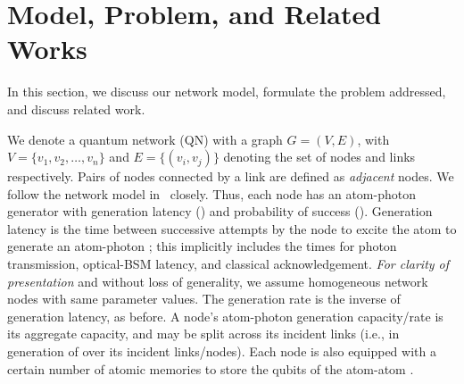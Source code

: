 \section{Model, Problem, and Related Works}
\label{sec:swapping_problem}

In this section, we discuss our network model, formulate the problem addressed, and discuss 
related work. 

We denote a quantum network (QN) with a graph $G = (V, E)$,
with $V = \{v_1, v_2, \ldots, v_n\}$  and $E = \{(v_i, v_j)\}$
denoting the set of nodes and links respectively.
Pairs of nodes connected by a link are defined as \textit{adjacent} nodes. 
We follow the network model in~\cite{caleffi} closely.
Thus, each node has an atom-photon \eps generator with generation 
latency (\gt) and probability of success (\gp). Generation latency
is the time between successive attempts by the node to excite the 
atom to generate an atom-photon \eps; this implicitly includes the times for
photon transmission, optical-BSM latency, and classical acknowledgement.
\textit{For clarity of presentation} and without loss of generality,  
we assume homogeneous network nodes with same parameter values.
The generation rate is the inverse
of generation latency, as before.
A node's atom-photon generation capacity/rate 
is its aggregate capacity, and may be split across its incident links 
(i.e., in generation 
of \epss over its incident links/nodes).
Each node is also equipped with a certain number of atomic
memories to store the  qubits of the atom-atom \epss. 

